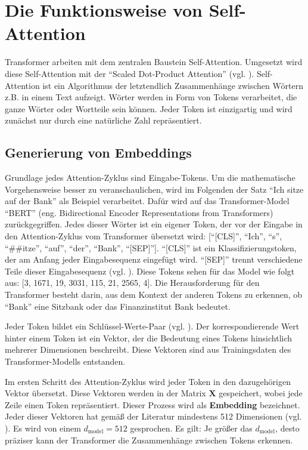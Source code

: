 \chapter{Die Funktionsweise von Self-Attention}

Transformer arbeiten mit dem zentralen Baustein Self-Attention.
Umgesetzt wird diese Self-Attention mit der \enquote{Scaled Dot-Product Attention} (vgl. \cite[S. 4]{attention}).
Self-Attention ist ein Algorithmus der letztendlich Zusammenhänge zwischen Wörtern z.B. in einem Text aufzeigt.
Wörter werden in Form von Tokens verarbeitet, die ganze Wörter oder Wortteile sein können.
Jeder Token ist einzigartig und wird zunächst nur durch eine natürliche Zahl repräsentiert.

\section{Generierung von Embeddings}

Grundlage jedes Attention-Zyklus sind Eingabe-Tokens.
Um die mathematische Vorgehensweise besser zu veranschaulichen, wird im Folgenden der Satz \enquote{Ich sitze auf der Bank} als Beispiel verarbeitet.
Dafür wird auf das Transformer-Model \enquote{BERT} (eng. Bidirectional Encoder Representations from Transformers) zurückgegriffen.
Jedes dieser Wörter ist ein eigener Token, der vor der Eingabe in den Attention-Zyklus vom Transformer übersetzt wird:
[\enquote{[CLS]}, \enquote{Ich}, \enquote{s}, \enquote{##itze}, \enquote{auf}, \enquote{der}, \enquote{Bank}, \enquote{[SEP]}].  
\enquote{[CLS]} ist ein Klassifizierungstoken, der am Anfang jeder Eingabesequenz eingefügt wird.
\enquote{[SEP]} trennt verschiedene Teile dieser Eingabesequenz (vgl. \cite[S. 221]{paass.2020}).
Diese Tokens sehen für das Model wie folgt aus: [3, 1671, 19, 3031, 115, 21, 2565, 4].
Die Herausforderung für den Transformer besteht darin, aus dem Kontext der anderen Tokens zu erkennen, ob \enquote{Bank} eine Sitzbank oder das Finanzinstitut Bank bedeutet.

Jeder Token bildet ein Schlüssel-Werte-Paar (vgl. \cite[S. 172]{paass.2020}).
Der korrespondierende Wert hinter einem Token ist ein Vektor, der die Bedeutung eines Tokens hinsichtlich mehrerer Dimensionen beschreibt.  
Diese Vektoren sind aus Trainingsdaten des Transformer-Modells entstanden.

Im ersten Schritt des Attention-Zyklus wird jeder Token in den dazugehörigen Vektor übersetzt.  
Diese Vektoren werden in der Matrix $\mathbf{X}$ gespeichert, wobei jede Zeile einen Token repräsentiert.  
Dieser Prozess wird als \textbf{Embedding} bezeichnet.  
Jeder dieser Vektoren hat gemäß der Literatur mindestens 512 Dimensionen (vgl. \cite[S. 3]{attention}).  
Es wird von einem \( d_{\text{model}} = 512 \) gesprochen.  
Es gilt: Je größer das \( d_{\text{model}} \), desto präziser kann der Transformer die Zusammenhänge zwischen Tokens erkennen.


